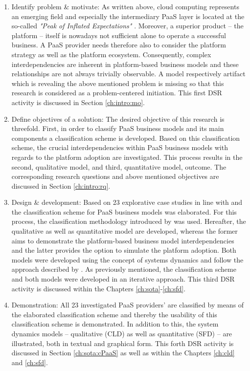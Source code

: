 \begin{enumerate}
	\item Identify problem \& motivate: As written above, cloud computing represents an emerging field and especially the intermediary \ac{PaaS} layer is located at the so-called \textit{"Peak of Inflated Expectations"} \citep[p. 5]{Smith2012}. Moreover, a superior product -- the platform -- itself is nowadays not sufficient alone to operate a successful business. A \ac{PaaS} provider needs therefore also to consider the platform strategy as well as the platform ecosystem. Consequently, complex interdependencies are inherent in platform-based business models and these relationships are not always trivially observable. A model respectively artifact which is revealing the above mentioned problem is missing so that this research is considered as a problem-centered initiation. This first \ac{DSR} activity is discussed in Section \ref{ch:intro:mo}.
	\item Define objectives of a solution: The desired objective of this research is threefold. First, in order to classify \ac{PaaS} business models and its main components a classification scheme is developed. Based on this classification scheme, the crucial interdependencies within \ac{PaaS} business models with regards to the platform adoption are investigated. This process results in the second, qualitative model, and third, quantitative model, outcome. The corresponding research questions and above mentioned objectives are discussed in Section \ref{ch:intro:rq}.
	\item Design \& development: Based on 23 explorative case studies in line with \citet{Eisenhardt1989} and \citet{Yin2008} the classification scheme for \ac{PaaS} business models was elaborated. For this process, the classification methodology introduced by \citet{Fettke2003} was used. Hereafter, the qualitative as well as quantitative model are developed, whereas the former aims to demonstrate the platform-based business model interdependencies and the latter provides the option to simulate the platform adoption. Both models were developed using the concept of systems dynamics and follow the approach described by \citet{Sterman2000,Sterman2001}. As previously mentioned, the classification scheme and both models were developed in an iterative approach. This third \ac{DSR} activity is discussed within the Chapters \ref{ch:sota}-\ref{ch:sfd}.
	\item Demonstration: All 23 investigated \ac{PaaS} providers' are classified by means of the elaborated classification scheme and thereby the usability of this classification scheme is demonstrated. In addition to this, the system dynamics models -- qualitative (\ac{CLD}) as well as quantitative (\ac{SFD}) -- are illustrated, both in textual and graphical form. This forth \ac{DSR} activity is discussed in Section \ref{ch:sota:cPaaS} as well as within the Chapters \ref{ch:cld} and \ref{ch:sfd}.

\end{enumerate}
